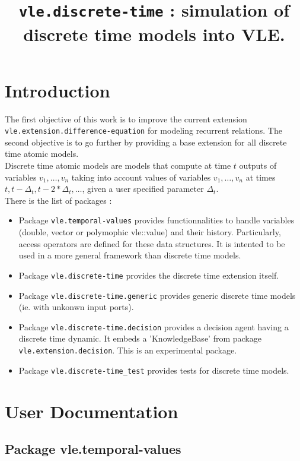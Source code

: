 \documentclass{article}
\title{{\tt vle.discrete-time} : simulation of 
discrete time models into VLE.}
\theoremstyle{remark}
\begin{document}
\maketitle

\tableofcontents

\section{Introduction}

The first objective of this work is to improve the current extension \\
 {\tt vle.extension.difference-equation} for modeling recurrent relations.
 The second objective is to go further by providing a base extension for all
discrete time atomic models.
~\\
Discrete time atomic models are models that compute at time $t$ outputs of
variables $v_1, \ldots, v_n$ taking into account values of variables $v_1,
\ldots, v_n$ at times $t, t - \Delta_t, t - 2 * \Delta_t,\ldots$, 
given a user specified parameter $\Delta_t$.
~\\
There is the list of packages :
\begin{itemize}
\item Package {\tt vle.temporal-values} provides functionnalities to handle
variables (double, vector or polymophic vle::value) and their history. Particularly,
access operators are defined for these data structures. It is intented to be
used in a more general framework than discrete time models.
\item Package {\tt vle.discrete-time} provides the discrete time extension
itself.
\item Package {\tt vle.discrete-time.generic} provides generic discrete
time models (ie. with unkonwn input ports).
\item Package {\tt vle.discrete-time.decision} provides a decision agent having
a discrete time dynamic. It embeds a 'KnowledgeBase' from package
{\tt vle.extension.decision}. This is an experimental package.
\item Package {\tt vle.discrete-time\_test} provides tests for discrete time
models.
\end{itemize}

\section{User Documentation}

\subsection{Package vle.temporal-values}
\label{sec:user:temp}
\end{document}
